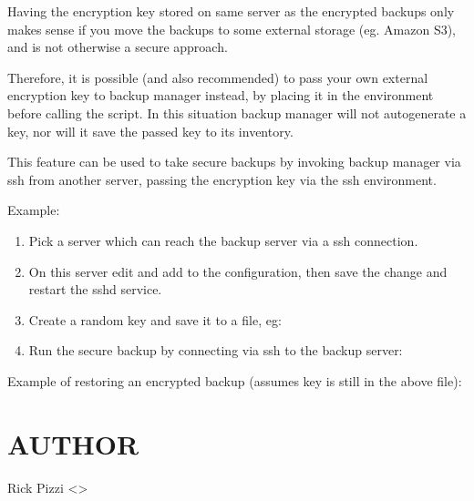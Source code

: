 \documentclass[letterpaper,10pt,english]{sphinxmanual}
\begin{document}
Having the encryption key stored on same server as the encrypted backups only makes sense
if you move the backups to some external storage (eg. Amazon S3), and is not otherwise
a secure approach.

Therefore, it is possible (and also recommended) to pass your own external encryption key
to backup manager instead, by placing it in the environment before calling the script.  In this
situation backup manager will not autogenerate a key, nor will it save the passed key to its
inventory.

This feature can be used to take secure backups by invoking backup manager via ssh from another
server, passing the encryption key via the ssh environment.

Example:
\begin{enumerate}
%
\item {} 
Pick a server which can reach the backup server via a ssh connection.

\item {} 
On this server edit  and add  to the configuration,
then save the change and restart the sshd service.

\item {} 
Create a random key and save it to a file, eg:

\item {} 
Run the secure backup by connecting via ssh to the backup server:

\end{enumerate}

Example of restoring an encrypted backup (assumes key is still in the above file):
\begin{quote}

\end{quote}


\section{AUTHOR}
\label{\detokenize{mariadb-backup-manager:author}}
Rick Pizzi \textless{}\textgreater{}
\end{document}

